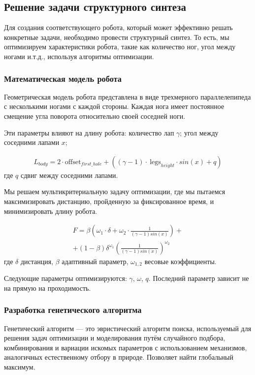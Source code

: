 

\subsection{Решение задачи структурного синтеза}
Для создания соответствующего робота, который может эффективно решать конкретные задачи, необходимо провести структурный синтез. То есть, мы оптимизируем характеристики робота, такие как количество ног, угол между ногами и.т.д., используя алгоритмы оптимизации.

\subsubsection{Математическая модель робота}
Геометрическая модель робота представлена в виде трехмерного параллелепипеда с несколькими ногами с каждой стороны. Каждая нога имеет постоянное смещение угла поворота относительно своей соседней ноги.

Эти параметры влияют на длину робота:
количество лап  $\gamma$; угол между соседними лапами  $x$;

\begin{eqnarray}
    \label{eq:first}
    L_{body} = 2 \cdot \text{offset}_{first\_hole} + ((\gamma - 1) \cdot\ \text{legs}_{height} \cdot sin(x) + q)
\end{eqnarray}
где $q$ сдвиг между соседними лапами.

Мы решаем мультикритериальную задачу оптимизации, где мы пытаемся максимизировать дистанцию, пройденную за фиксированное время, и минимизировать длину робота.

\begin{eqnarray}
    \label{eq:second}
    F = \beta \left( {\omega}_{1} \cdot \delta + {\omega}_{2} \cdot \frac{1}{(\gamma - 1) sin(x)}\right) +\\ \nonumber + (1 - \beta) {\delta}^{{\omega}_{1}} {\left( \frac{1}{(\gamma - 1) sin(x)}\right)}^{{\omega}_{2}}
\end{eqnarray}
где $\delta$ дистанция, $\beta$ адаптивный параметр, ${\omega}_{1,2}$ весовые коэффициенты.

Следующие параметры оптимизируются: $\gamma$, $\omega$, $q$. Последний параметр зависит не на прямую на проходимость.

\subsubsection{Разработка генетического алгоритма}
Генетический алгоритм --- это эвристический алгоритм поиска, используемый для решения задач оптимизации и моделирования путём случайного подбора, комбинирования и вариации искомых параметров с использованием механизмов, аналогичных естественному отбору в природе. Позволяет найти глобальный максимум.

